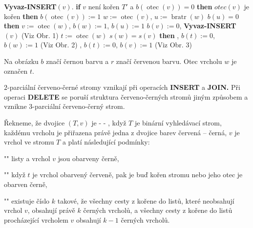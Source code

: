 \documentclass[a4paper,12pt]{article}
\def \emph#1{\underbar{#1}}
\DeclareMathOperator*{\otec}{otec}
\DeclareMathOperator*{\bratr}{bratr}
\begin{document}
{\bf Vyvaz-INSERT$(v)$}.\newline 
{\bf if} $v$ není kořen $T'$ a $b(\otec(v))=0$ {\bf then}\newline 
\phantom{---}{\bf if} $otec(v)$ je kořen {\bf then}\newline 
\phantom{------}$b(\otec(v)):=1$\newline 
\phantom{---}{\bf else}\newline 
\phantom{------}$w:=\otec(v)$, $u:=\bratr(w)$\newline 
\phantom{------}{\bf if} $b(u)=0$ {\bf then}\newline 
\phantom{---------}$v:=\otec(w)$, $b(w):=1$, $b(u):=1$\newline 
\phantom{---------}$b(v):=0$, {\bf Vyvaz-INSERT$(v)$} (Viz Obr. 1)\newline 
\phantom{------}{\bf else}\newline 
\phantom{---------}$t:=\otec(w)$\newline 
\phantom{---------}{\bf if} $s(w)=s(v)$ {\bf then}\newline 
\phantom{------------}{\bf Rotace$(t,w)$}, $b(t):=0$, $b(w):=1$ (Viz Obr. 2)\newline 
\phantom{---------}{\bf else}\newline 
\phantom{------------}{\bf Dvojita-rotace$(t,w,v)$}, $b(t):=0$, $b(v):=1$ (Viz Obr. 3)\newline 
\phantom{---------}{\bf endif}\newline 
\phantom{------}{\bf endif}\newline 
\phantom{---}{\bf endif\newline 
endif}

Na obrázku $b$ značí černou barvu a $r$ značí červenou 
barvu. Otec vrcholu $w$ je označen $t$. 

\midinsert
\centerline{}
\endcaption
\endinsert

\midinsert
\centerline{}
\endcaption
\endinsert
\newpage

\midinsert
\centerline{}
\endcaption
\endinsert

$2$-parciální červeno-černé stromy vznikají při 
operacích {\bf INSERT} a {\bf JOIN.}  Při operaci {\bf DELETE} se poruší 
struktura červeno-černých stromů jiným 
způsobem a vznikne 3-parciální červeno-čer\-ný strom.  

Řekneme, že dvojice $(T,v)$ je \emph{3}-\emph{parciální} 
\emph{červeno}-\emph{černý} \emph{strom}, když $T$ je binární 
vy\-hledávací strom, každému vrcholu je při\-řazena právě jedna z 
dvojice barev červená -- černá, $v$ je vrchol ve stromu $
T$ a 
platí následující podmínky: 
\roster
\item"{}"
listy a vrchol $v$ jsou obarveny černě,
\item"{}"
když $t$ je vrchol obarvený červeně, pak je buď kořen 
stromu nebo jeho otec je obarven černě,
\item"{}"
existuje číslo $k$ takové, že všechny cesty z kořene do 
listů, které neobsahují vrchol $v$, obsahují právě 
$k$ čer\-ných vrcholů, a všechny cesty z kořene do 
listů prochá\-ze\-jí\-cí vrcholem $v$ obsahují $
k-1$ černých 
vrcholů.
\endroster
\end{document}
